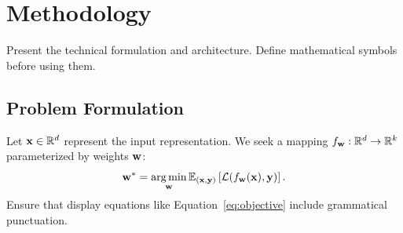 \section{Methodology}
\label{sec:methodology}

Present the technical formulation and architecture. Define mathematical symbols before using them.

\subsection{Problem Formulation}
Let $\mathbf{x} \in \mathbb{R}^{d}$ represent the input representation. We seek a mapping $f_{\mathbf{w}}: \mathbb{R}^d \to \mathbb{R}^k$ parameterized by weights $\mathbf{w}$:
\begin{equation}
    \label{eq:objective}
    \mathbf{w}^* = \operatorname*{arg\,min}_{\mathbf{w}} \mathbb{E}_{(\mathbf{x}, \mathbf{y})} \left[ \mathcal{L}(f_{\mathbf{w}}(\mathbf{x}), \mathbf{y}) \right].
\end{equation}
Ensure that display equations like Equation~\eqref{eq:objective} include grammatical punctuation.
